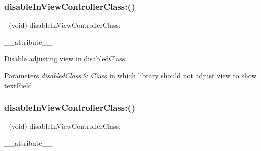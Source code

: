 \subsubsection{\texorpdfstring{disable\+In\+View\+Controller\+Class\+:()}{disableInViewControllerClass:()}\hspace{0.1cm}{\footnotesize\ttfamily [1/3]}}
{\footnotesize\ttfamily -\/ (void) disable\+In\+View\+Controller\+Class\+: \begin{DoxyParamCaption}\item[{((deprecated(\char`\"{}This method is replaced with disable\+Distance\+Handling\+In\+View\+Controller\+Class\+: method to adopt more graceful method name. Some developers confuses with this method name. This method will be removed in upcoming release.\char`\"{})))}]{\+\_\+\+\_\+attribute\+\_\+\+\_\+ }\end{DoxyParamCaption}}

Disable adjusting view in disabled\+Class


\begin{DoxyParams}{Parameters}
{\em disabled\+Class} & Class in which library should not adjust view to show text\+Field. \\
\hline
\end{DoxyParams}
\mbox{\label{interface_i_q_keyboard_manager_a95cec0b3acf0d474e40883408b1c7785}} 
\subsubsection{\texorpdfstring{disable\+In\+View\+Controller\+Class\+:()}{disableInViewControllerClass:()}\hspace{0.1cm}{\footnotesize\ttfamily [2/3]}}
{\footnotesize\ttfamily -\/ (void) disable\+In\+View\+Controller\+Class\+: \begin{DoxyParamCaption}\item[{((deprecated(\char`\"{}This method is replaced with disable\+Distance\+Handling\+In\+View\+Controller\+Class\+: method to adopt more graceful method name. Some developers confuses with this method name. This method will be removed in upcoming release.\char`\"{})))}]{\+\_\+\+\_\+attribute\+\_\+\+\_\+ }\end{DoxyParamCaption}}

